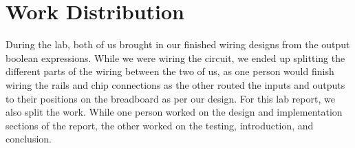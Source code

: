 \documentclass{article}
\begin{document}
\section{Work Distribution}

During the lab, both of us brought in our finished wiring designs from
the output boolean expressions. While we were wiring the circuit, we
ended up splitting the different parts of the wiring between the two
of us, as one person would finish wiring the rails and chip
connections as the other routed the inputs and outputs to their
positions on the breadboard as per our design. For this lab report, we
also split the work. While one person worked on the design and
implementation sections of the report, the other worked on the
testing, introduction, and conclusion.
\end{document}
